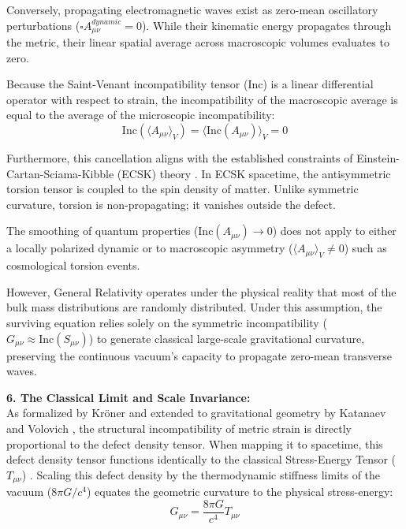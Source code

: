 Conversely, propagating electromagnetic waves exist as zero-mean oscillatory perturbations ($\square A_{\mu\nu}^{dynamic} = 0$). While their kinematic energy propagates through the metric, their linear spatial average across macroscopic volumes evaluates to zero. 

Because the Saint-Venant incompatibility tensor ($\text{Inc}$) is a linear differential operator with respect to strain, the incompatibility of the macroscopic average is equal to the average of the microscopic incompatibility:
\begin{equation}
    \text{Inc}(\langle A_{\mu\nu} \rangle_V) = \langle \text{Inc}(A_{\mu\nu}) \rangle_V = 0
\end{equation}

Furthermore, this cancellation aligns with the established constraints of Einstein-Cartan-Sciama-Kibble (ECSK) theory \cite{kibble1961lorentz, sciama1964physical}. In ECSK spacetime, the antisymmetric torsion tensor is coupled to the spin density of matter. Unlike symmetric curvature, torsion is non-propagating; it vanishes outside the defect. 

The smoothing of quantum properties ($\text{Inc}(A_{\mu\nu}) \to 0$) does not apply to either a locally polarized dynamic or to macroscopic asymmetry ($\langle A_{\mu\nu} \rangle_V \neq 0$) such as cosmological torsion events. 

However, General Relativity operates under the physical reality that most of the bulk mass distributions are randomly distributed.  Under this assumption, the surviving equation relies solely on the symmetric incompatibility ($G_{\mu\nu} \approx \text{Inc}(S_{\mu\nu})$) to generate classical large-scale gravitational curvature, preserving the continuous vacuum's capacity to propagate zero-mean transverse waves. 

\vspace{0.2 cm}

\textbf{6. The Classical Limit and Scale Invariance:} \\
As formalized by Kr\"{o}ner and extended to gravitational geometry by Katanaev and Volovich \cite{katanaev1992theory}, the structural incompatibility of metric strain is directly proportional to the defect density tensor. When mapping it to spacetime, this defect density tensor functions identically to the classical Stress-Energy Tensor ($T_{\mu\nu}$) \cite{kleinert2008multivalued}. Scaling this defect density by the thermodynamic stiffness limits of the vacuum ($8\pi G / c^4$) equates the geometric curvature to the physical stress-energy:
\begin{equation}
    G_{\mu\nu} = \frac{8\pi G}{c^4} T_{\mu\nu} \label{eq:einstein_field_equation}
\end{equation}

